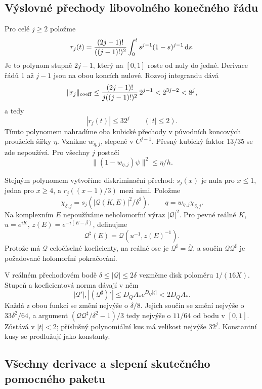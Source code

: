 \documentclass[11pt,a4paper]{article}
\theoremstyle{remark}\newtheorem{remark}[theorem]{Poznámka}
\numberwithin{equation}{section}
\begin{document}
\subsection{Výslovné přechody libovolného konečného řádu}

Pro celé \(j\ge2\) položme
\begin{equation}
r_j(t)={(2j-1)!\over((j-1)!)^2}
\int_0^t s^{j-1}(1-s)^{j-1}\,\mathrm ds.
\label{eq:betataper}
\end{equation}
Je to polynom stupně \(2j-1\), který na \([0,1]\) roste od nuly do jedné. Derivace řádů 1 až \(j-1\) jsou na obou koncích nulové. Rozvoj integrandu dává
\[
\|r_j\|_{\rm coeff}
\le{(2j-1)!\over j((j-1)!)^2}\,2^{j-1}
<2^{3j-2}<8^j,
\]
a tedy
\begin{equation}
|r_j(t)|\le32^j\qquad (|t|\le2).
\label{eq:tapercomplex}
\end{equation}
Tímto polynomem nahradíme oba kubické přechody v původních koncových proužcích šířky \(\eta\). Vznikne \(w_{\eta,j}\), slepené v \(C^{j-1}\). Přesný kubický faktor \(13/35\) se zde nepoužívá. Pro všechny \(j\) postačí
\begin{equation}
\|(1-w_{\eta,j})\psi\|^2\le\eta/h.
\label{eq:higherloss}
\end{equation}

Stejným polynomem vytvoříme diskriminační přechod: \(s_j(x)\) je nula pro \(x\le1\), jedna pro \(x\ge4\), a \(r_j((x-1)/3)\) mezi nimi. Položme
\[
\chi_{\delta,j}=s_j(|\mathscr Q(K,E)|^2/\delta^2),
\qquad q=w_{\eta,j}\chi_{\delta,j}.
\]
Na komplexním \(E\) nepoužíváme neholomorfní výraz \(|\mathscr Q|^2\). Pro pevné reálné \(K\), \(u=e^{iK}\), \(z(E)=e^{-i(E-\beta)}\), definujme
\[
\mathscr Q^\sharp(E)=\mathscr Q(u^{-1},z(E)^{-1}).
\]
Protože má \(\mathscr Q\) celočíselné koeficienty, na reálné ose je
\(\mathscr Q^\sharp=\overline{\mathscr Q}\), a součin
\(\mathscr Q\mathscr Q^\sharp\) je požadované holomorfní pokračování.

V reálném přechodovém bodě \(\delta\le|\mathscr Q|\le2\delta\) vezměme disk poloměru \(1/(16X)\). Stupeň a koeficientová norma dávají v něm
\[
|\mathscr Q'|,|(\mathscr Q^\sharp)'|
\le D_QA_*e^{D_Q|\zeta|}<2D_QA_*.
\]
Každá z obou funkcí se změní nejvýše o \(\delta/8\). Jejich součin se změní nejvýše o \(33\delta^2/64\), a argument
\((\mathscr Q\mathscr Q^\sharp/\delta^2-1)/3\) tedy nejvýše o \(11/64\) od bodu v \([0,1]\). Zůstává v \(|t|<2\); příslušný polynomiální kus má velikost nejvýše \(32^j\). Konstantní kusy se prodlužují jako konstanty.

\subsection{Všechny derivace a slepení skutečného pomocného paketu}
\end{document}

